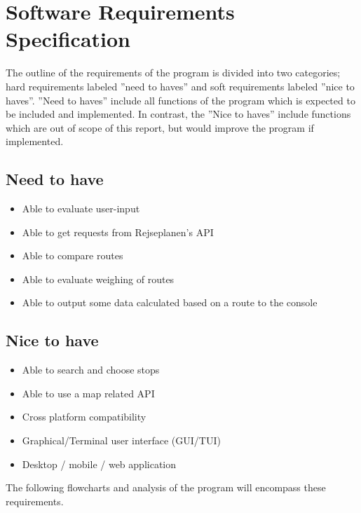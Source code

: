 \section{Software Requirements Specification}\label{sec:software-requirements-specification}

The outline of the requirements of the program is divided into two categories; hard requirements labeled ''need to
haves'' and soft requirements labeled ''nice to haves''.
''Need to haves'' include all functions of the program which is expected to be included and implemented.
In contrast, the ''Nice to haves'' include functions which are out of scope of this report, but would improve the
program if implemented.

\subsection{Need to have}\label{subsec:need-to-have}

\begin{itemize}
    \item Able to evaluate user-input
    \item Able to get requests from Rejseplanen’s API
    \item Able to compare routes
    \item Able to evaluate weighing of routes
    \item Able to output some data calculated based on a route to the console
\end{itemize}

\subsection{Nice to have}\label{subsec:nice-to-have}

\begin{itemize}
    \item Able to search and choose stops
    \item Able to use a map related API
    \item Cross platform compatibility
    \item Graphical/Terminal user interface (GUI/TUI)
    \item Desktop / mobile / web application
\end{itemize}

The following flowcharts and analysis of the program will encompass these requirements.
